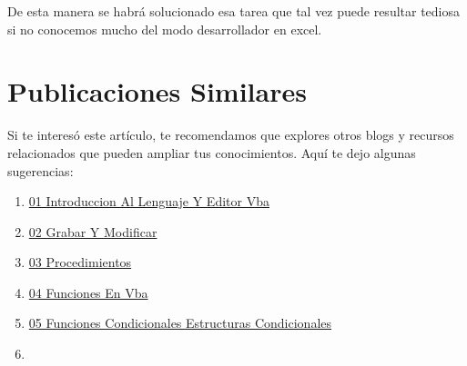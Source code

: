 \documentclass[
  jou,
  floatsintext,
  longtable,
  a4paper,
  nolmodern,
  notxfonts,
  notimes,
  colorlinks=true,linkcolor=blue,citecolor=blue,urlcolor=blue]{apa7}
\providecommand{\tightlist}{%
  \setlength{\itemsep}{0pt}\setlength{\parskip}{0pt}}
\begin{document}
De esta manera se habrá solucionado esa tarea que tal vez puede resultar
tediosa si no conocemos mucho del modo desarrollador en excel.

\section{Publicaciones Similares}\label{publicaciones-similares}

Si te interesó este artículo, te recomendamos que explores otros blogs y
recursos relacionados que pueden ampliar tus conocimientos. Aquí te dejo
algunas sugerencias:

\begin{enumerate}
\def\labelenumi{\arabic{enumi}.}
\tightlist
\item
  \href{https://achalmaedison.netlify.app/herramientas-oficina/ofimatica/2022-12-05-01-introduccion-al-lenguaje-y-editor-vba/index.pdf}{}
  \href{https://achalmaedison.netlify.app/herramientas-oficina/ofimatica/2022-12-05-01-introduccion-al-lenguaje-y-editor-vba}{01
  Introduccion Al Lenguaje Y Editor Vba}
\item
  \href{https://achalmaedison.netlify.app/herramientas-oficina/ofimatica/2022-12-12-02-grabar-y-modificar/index.pdf}{}
  \href{https://achalmaedison.netlify.app/herramientas-oficina/ofimatica/2022-12-12-02-grabar-y-modificar}{02
  Grabar Y Modificar}
\item
  \href{https://achalmaedison.netlify.app/herramientas-oficina/ofimatica/2022-12-19-03-procedimientos/index.pdf}{}
  \href{https://achalmaedison.netlify.app/herramientas-oficina/ofimatica/2022-12-19-03-procedimientos}{03
  Procedimientos}
\item
  \href{https://achalmaedison.netlify.app/herramientas-oficina/ofimatica/2022-12-26-04-funciones-en-vba/index.pdf}{}
  \href{https://achalmaedison.netlify.app/herramientas-oficina/ofimatica/2022-12-26-04-funciones-en-vba}{04
  Funciones En Vba}
\item
  \href{https://achalmaedison.netlify.app/herramientas-oficina/ofimatica/2023-01-02-05-funciones-condicionales-estructuras-condicionales/index.pdf}{}
  \href{https://achalmaedison.netlify.app/herramientas-oficina/ofimatica/2023-01-02-05-funciones-condicionales-estructuras-condicionales}{05
  Funciones Condicionales Estructuras Condicionales}
\item
  \href{https://achalmaedison.netlify.app/herramientas-oficina/ofimatica/2023-01-09-06-funciones-iterativas-estructuras-repetitivas-o-bucles/index.pdf}{}

\end{enumerate}
\end{document}
